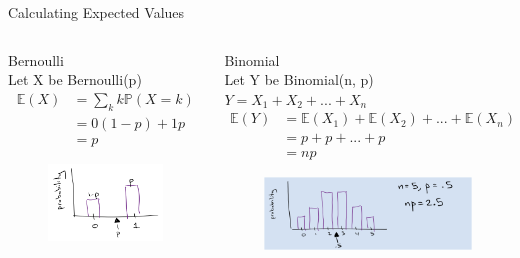 \documentclass[aspectratio=169]{../latex_main/tntbeamer}  %
\begin{document}
	
	\begin{frame}[c]{Calculating Expected Values}
	   \begin{columns}
	        \begin{column}{.4\textwidth}
	        Bernoulli\\
	        Let X be Bernoulli(p)\\
	        \begin{align*}
	            \mathbb{E}(X) &= \sum\limits_k k\mathbb{P}(X=k)\\
	            &= 0(1-p)+1p\\
	            &= p
	        \end{align*}
	            \begin{figure}
	                \centering
	                \includegraphics[scale=.5]{Bild21}
	            \end{figure}
	        \end{column}
	            
	        \begin{column}{.4\textwidth}
	            Binomial\\
	            Let Y be Binomial(n, p)\\
	            $Y=X_1+X_2+...+X_n$
	       \begin{align*}
	            \mathbb{E}(Y) &= \mathbb{E}(X_1) +\mathbb{E}(X_2) + ...+\mathbb{E}(X_n)\\
	            &= p + p +...+p\\
	            &= np
	        \end{align*}
	            \begin{figure}
	                \centering
	                \includegraphics[scale=.5]{Bild22}
	            \end{figure}
	        \end{column}
	    \end{columns}

	\end{frame}
	
\end{document}
